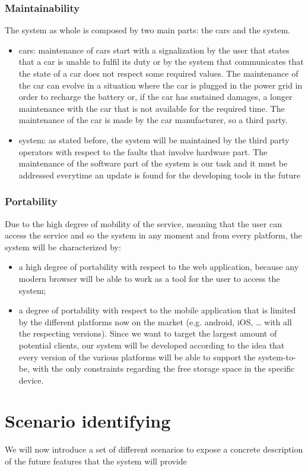 \documentclass[10pt, a4paper,titlepage]{article}
\begin{document}
\subsubsection{Maintainability}
The system as whole is composed by two main parts: the cars and the system.
\begin{itemize}
\item cars: maintenance of cars start with a signalization by the user that states that a car is unable to fulfil its duty or by the system that communicates that the state of a car does not respect some required values. The maintenance of the car can evolve in a situation where the car is plugged in the power grid in order to recharge the battery or, if the car has sustained damages, a longer maintenance with the car that is not available for the required time. The maintenance of the car is made by the car manufacturer, so a third party. 
\item system: as stated before, the system will be maintained by the third party operators with respect to the faults that involve hardware part. The maintenance of the software part of the system is our task and it must be addressed everytime an update is found for the developing tools in the future
\end{itemize}
\subsubsection{Portability}
Due to the high degree of mobility of the service, meaning that the user can access the service and so the system in any moment and from every platform, the system will be characterized by:
\begin{itemize}
\item a high degree of portability with respect to the web application, because any modern browser will be able to work as a tool for the user to access the system;
\item a degree of portability with respect to the mobile application that is limited by the different platforms now on the market (e.g. android, iOS, … with all the respecting versions). Since we want to target the largest amount of potential clients, our system will be developed according to the idea that every version of the various platforms will be able to support the system-to-be, with the only constraints regarding the free storage space in the specific device.
\end{itemize}
\section{Scenario identifying}
We will now introduce a set of different scenarios to expose a concrete description of the future features that the system will provide
\end{document}
